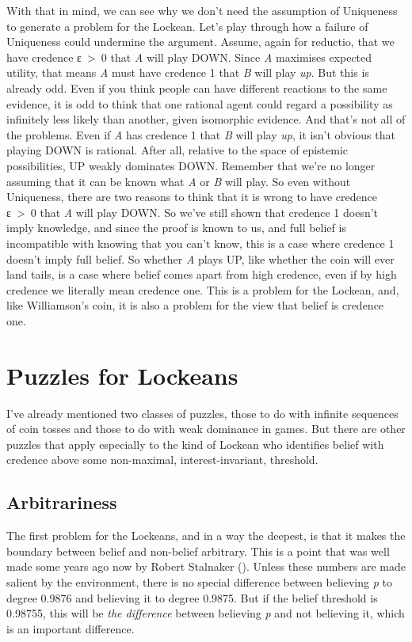\documentclass[
  12pt,
  letterpaper,
]{scrbook}
\begin{document}
With that in mind, we can see why we don't need the assumption of
Uniqueness to generate a problem for the Lockean. Let's play through how
a failure of Uniqueness could undermine the argument. Assume, again for
reductio, that we have credence ε~\textgreater~0 that \emph{A} will play
DOWN. Since \emph{A} maximises expected utility, that means \emph{A}
must have credence 1 that \emph{B} will play \emph{up}. But this is
already odd. Even if you think people can have different reactions to
the same evidence, it is odd to think that one rational agent could
regard a possibility as infinitely less likely than another, given
isomorphic evidence. And that's not all of the problems. Even if
\emph{A} has credence 1 that \emph{B} will play \emph{up}, it isn't
obvious that playing DOWN is rational. After all, relative to the space
of epistemic possibilities, UP weakly dominates DOWN. Remember that
we're no longer assuming that it can be known what \emph{A} or \emph{B}
will play. So even without Uniqueness, there are two reasons to think
that it is wrong to have credence ε~\textgreater~0 that \emph{A} will
play DOWN. So we've still shown that credence 1 doesn't imply knowledge,
and since the proof is known to us, and full belief is incompatible with
knowing that you can't know, this is a case where credence 1 doesn't
imply full belief. So whether \emph{A} plays UP, like whether the coin
will ever land tails, is a case where belief comes apart from high
credence, even if by high credence we literally mean credence one. This
is a problem for the Lockean, and, like Williamson's coin, it is also a
problem for the view that belief is credence one.

\section{Puzzles for Lockeans}\label{sec-lockepuzzles}

I've already mentioned two classes of puzzles, those to do with infinite
sequences of coin tosses and those to do with weak dominance in games.
But there are other puzzles that apply especially to the kind of Lockean
who identifies belief with credence above some non-maximal,
interest-invariant, threshold.

\subsection{Arbitrariness}\label{sec-lockearb}

The first problem for the Lockeans, and in a way the deepest, is that it
makes the boundary between belief and non-belief arbitrary. This is a
point that was well made some years ago now by Robert Stalnaker
(). Unless these numbers are made
salient by the environment, there is no special difference between
believing \emph{p} to degree 0.9876 and believing it to degree 0.9875.
But if the belief threshold is 0.98755, this will be \emph{the
difference} between believing \emph{p} and not believing it, which is an
important difference.
\end{document}
